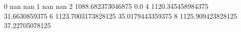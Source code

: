0 nan nan
1 nan nan
2 1088.682373046875 0.0
4 1120.345458984375 31.6630859375
6 1123.7003173828125 35.0179443359375
8 1125.909423828125 37.22705078125
